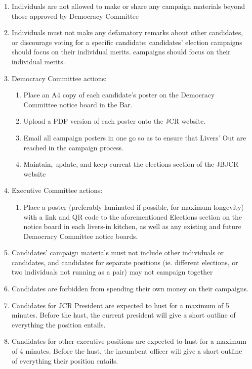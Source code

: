 \begin{enumerate}
\begin{enumerate}
        \item Individuals are not allowed to make or share any campaign materials beyond those approved by Democracy Committee 
        \item Individuals must not make any defamatory remarks about other candidates, or discourage voting for a specific candidate; candidates’ election campaigns should focus on their individual merits.
        campaigns should focus on their individual merits.
        \item Democracy Committee actions:
        \begin{enumerate}
            \item Place an A4 copy of each candidate’s poster on the Democracy Committee notice board in the Bar.
            \item Upload a PDF version of each poster onto the JCR website.
            \item Email all campaign posters in one go so as to ensure that Livers’ Out are reached in the campaign process.
            \item Maintain, update, and keep current the elections section of the JBJCR website 
        \end{enumerate}
        \item Executive Committee actions:
        \begin{enumerate}
            \item Place a poster (preferably laminated if possible, for maximum longevity) with a link and QR code to the aforementioned Elections section on the notice board in each livers-in kitchen, as well as any existing and future Democracy Committee notice boards.
        \end{enumerate}
        \item Candidates’ campaign materials must not include other individuals or candidates, and candidates for separate positions (ie. different elections, or two individuals not running as a pair) may not campaign together
        \item Candidates are forbidden from spending their own money on their campaigns.
        \item Candidates for JCR President are expected to hust for a maximum of 5 minutes. Before the hust, the current president will give a short outline of everything the position entails.
        \item Candidates for other executive positions are expected to hust for a maximum of 4 minutes. Before the hust, the incumbent officer will give a short outline of everything their position entails.

\end{enumerate}
\end{enumerate}
